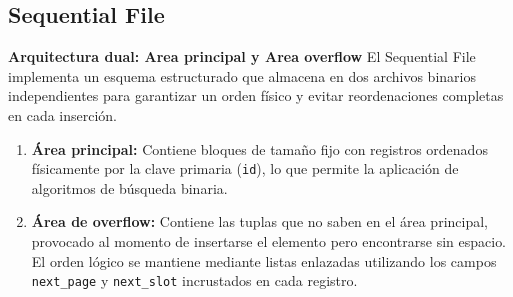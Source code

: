\documentclass[a4paper,12pt]{article}
\begin{document}
\subsection{Sequential File}
\textbf{Arquitectura dual: Area principal y Area overflow}
El Sequential File implementa un esquema estructurado que almacena en dos archivos binarios independientes para garantizar un orden físico y evitar reordenaciones completas en cada inserción.


\begin{enumerate}
    \item \textbf{Área principal:} Contiene bloques de tamaño fijo con registros ordenados físicamente por la clave primaria (\texttt{id}), lo que permite la aplicación de algoritmos de búsqueda binaria.
    \item \textbf{Área de overflow:} Contiene las tuplas que no saben en el área principal, provocado al momento de insertarse el elemento pero encontrarse sin espacio. El orden lógico se mantiene mediante listas enlazadas utilizando los campos \texttt{next\_page} y \texttt{next\_slot} incrustados en cada registro.
\end{enumerate}
\end{document}
